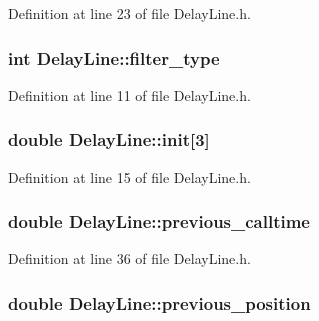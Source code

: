 Definition at line 23 of file DelayLine.h.

\hypertarget{classDelayLine_a86b4adda2792d346ee78b59a3e26992a}{
\subsubsection[{filter\_\-type}]{\setlength{\rightskip}{0pt plus 5cm}int {\bf DelayLine::filter\_\-type}}}
\label{classDelayLine_a86b4adda2792d346ee78b59a3e26992a}


Definition at line 11 of file DelayLine.h.

\hypertarget{classDelayLine_a998ede89f80499652d8f1da052fc90de}{
\subsubsection[{init}]{\setlength{\rightskip}{0pt plus 5cm}double {\bf DelayLine::init}\mbox{[}3\mbox{]}}}
\label{classDelayLine_a998ede89f80499652d8f1da052fc90de}


Definition at line 15 of file DelayLine.h.

\hypertarget{classDelayLine_a76e51812021b57490411c932f607d82b}{
\subsubsection[{previous\_\-calltime}]{\setlength{\rightskip}{0pt plus 5cm}double {\bf DelayLine::previous\_\-calltime}}}
\label{classDelayLine_a76e51812021b57490411c932f607d82b}


Definition at line 36 of file DelayLine.h.

\hypertarget{classDelayLine_a38f0fbf9f3090542153f5d6428edb20b}{
\subsubsection[{previous\_\-position}]{\setlength{\rightskip}{0pt plus 5cm}double {\bf DelayLine::previous\_\-position}}}
\label{classDelayLine_a38f0fbf9f3090542153f5d6428edb20b}



